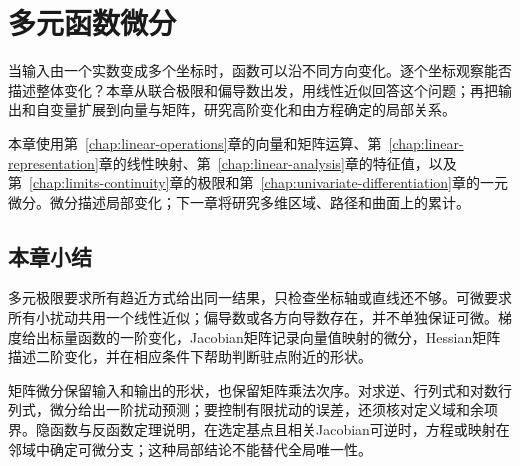 \chapter{多元函数微分}
\label{chap:multivariate-calculus}
\label{chap:multivariable-functions}

当输入由一个实数变成多个坐标时，函数可以沿不同方向变化。逐个坐标观察能否描述整体变化？本章从联合极限和偏导数出发，用线性近似回答这个问题；再把输出和自变量扩展到向量与矩阵，研究高阶变化和由方程确定的局部关系。

本章使用第~\ref{chap:linear-operations}章的向量和矩阵运算、第~\ref{chap:linear-representation}章的线性映射、第~\ref{chap:linear-analysis}章的特征值，以及第~\ref{chap:limits-continuity}章的极限和第~\ref{chap:univariate-differentiation}章的一元微分。微分描述局部变化；下一章将研究多维区域、路径和曲面上的累计。



\FloatBarrier
\section{本章小结}
\label{sec:multivariable-differentiation-summary}

多元极限要求所有趋近方式给出同一结果，只检查坐标轴或直线还不够。可微要求所有小扰动共用一个线性近似；偏导数或各方向导数存在，并不单独保证可微。梯度给出标量函数的一阶变化，Jacobian矩阵记录向量值映射的微分，Hessian矩阵描述二阶变化，并在相应条件下帮助判断驻点附近的形状。

矩阵微分保留输入和输出的形状，也保留矩阵乘法次序。对求逆、行列式和对数行列式，微分给出一阶扰动预测；要控制有限扰动的误差，还须核对定义域和余项界。隐函数与反函数定理说明，在选定基点且相关Jacobian可逆时，方程或映射在邻域中确定可微分支；这种局部结论不能替代全局唯一性。
